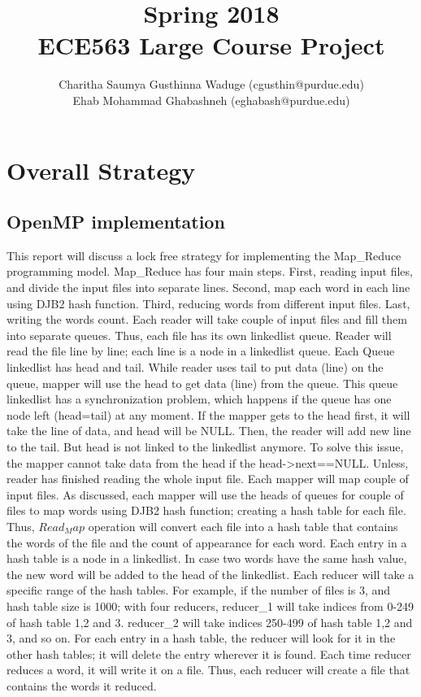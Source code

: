 \documentclass[12pt]{article}
\title{Spring 2018\\  ECE563 Large Course Project}
\author{Charitha Saumya Gusthinna Waduge (cgusthin@purdue.edu) \\ Ehab Mohammad Ghabashneh (eghabash@purdue.edu)}
\begin{document}
\maketitle
\section{Overall Strategy}
\subsection{OpenMP implementation}
This report will discuss a lock free strategy for implementing the Map\_Reduce programming model. Map\_Reduce has four main steps. First, reading input files, and divide the input files into separate lines. Second, map each word in each line using DJB2 hash function. Third, reducing words from different input files. Last, writing the words count.
\vspace{5mm}
\noindent Each reader will take couple of input files and fill them into separate queues. Thus, each file has its own linkedlist queue. Reader will read the file line by line; each line is a node in a linkedlist queue. Each Queue linkedlist has head and tail. While reader uses tail to put data (line) on the queue, mapper will use the head to get data (line) from the queue. This queue linkedlist has a synchronization problem, which happens if the queue has one node left (head=tail) at any moment. If the mapper gets to the head first, it will take the line of data, and head will be NULL. Then, the reader will add new line to the tail. But head is not linked to the linkedlist anymore. To solve this issue, the mapper cannot take data from the head if the head->next==NULL. Unless, reader has finished reading the whole input file. 
\vspace{5mm}
\noindent Each mapper will map couple of input files. As discussed, each mapper will use the heads of queues for couple of files to map words using DJB2 hash function; creating a hash table for each file. Thus, $Read_Map$ operation will convert each file into a hash table that contains the words of the file and the count of appearance for each word. Each entry in a hash table is a node in a linkedlist. In case two words have the same hash value, the new word will be added to the head of the linkedlist.
\vspace{5mm}
Each reducer will take a specific range of the hash tables. For example, if the number of files is 3, and hash table size is 1000; with four reducers, reducer\_1 will take indices from 0-249 of hash table 1,2 and 3. reducer\_2 will take indices 250-499 of hash table 1,2 and 3, and so on. For each entry in a hash table, the reducer will look for it in the other hash tables; it will delete the entry wherever it is found. Each time reducer reduces a word, it will write it on a file. Thus, each reducer will create a file that contains the words it reduced.
\end{document}
